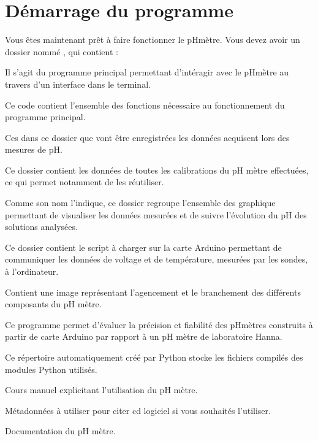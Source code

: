 \documentclass[letterpaper,10pt,french]{sphinxmanual}
\begin{document}
\section{Démarrage du programme}
\label{\detokenize{install:demarrage-du-programme}}
\sphinxAtStartPar
Vous êtes maintenant prêt à faire fonctionner le pH\sphinxhyphen{}mètre. Vous devez avoir un dossier nommé , qui contient :
\begin{description}
\sphinxAtStartPar
Il s’agit du programme principal permettant d’intéragir avec le pH\sphinxhyphen{}mètre au travers d’un interface dans le terminal.

\sphinxAtStartPar
Ce code contient l’ensemble des fonctions nécessaire au fonctionnement du programme principal.

\sphinxAtStartPar
Ces dans ce dossier que vont être enregistrées les données acquisent lors des mesures de pH.

\sphinxAtStartPar
Ce dossier contient les données de toutes les calibrations du pH mètre effectuées, ce qui permet notamment de les réutiliser.

\sphinxAtStartPar
Comme son nom l’indique, ce dossier regroupe l’ensemble des graphique permettant de visualiser les données mesurées et de suivre l’évolution du pH
des solutions analysées.

\sphinxAtStartPar
Ce dossier contient le script à charger sur la carte Arduino permettant de communiquer les données de voltage et de température, mesurées par les sondes, à l’ordinateur.

\sphinxAtStartPar
Contient une image représentant l’agencement et le branchement des différents composants du pH mètre.

\sphinxAtStartPar
Ce programme permet d’évaluer la précision et fiabilité des pH\sphinxhyphen{}mètres construits à partir de carte Arduino par rapport à un pH mètre de laboratoire Hanna.

\sphinxAtStartPar
Ce répertoire automatiquement créé par Python stocke les fichiers compilés des modules Python utilisés.

\sphinxAtStartPar
Cours manuel explicitant l’utilisation du pH mètre.

\sphinxAtStartPar
Métadonnées à utiliser pour citer cd logiciel si vous souhaités l’utiliser.

\sphinxAtStartPar
Documentation du pH mètre.

\end{description}
\end{document}
